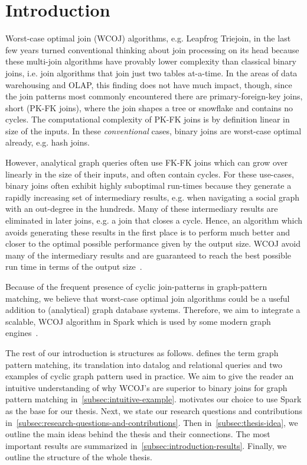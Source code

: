 \section{Introduction} \label{sec:introduction}
Worst-case optimal join (WCOJ) algorithms, e.g. Leapfrog Triejoin, in the last few years turned conventional thinking about join processing
on its head because these multi-join algorithms have provably lower complexity than classical binary joins,
i.e. join algorithms that join just two tables at-a-time.
In the areas of data warehousing and OLAP, this finding does not have much impact, though,
since the join patterns most commonly encountered there are primary-foreign-key joins, short (PK-FK joins),
where the join shapes a tree or snowflake and contains no cycles.
The computational complexity of PK-FK joins is by definition linear in size of the inputs.
In these \textit{conventional} cases, binary joins are worst-case optimal already, e.g. hash joins.

However, analytical graph queries often use FK-FK joins which can grow over linearly in the size of their inputs,
and often contain cycles.
For these use-cases, binary joins often exhibit highly suboptimal run-times because they generate a rapidly increasing set of
intermediary results, e.g. when navigating a social graph with an out-degree in the hundreds.
Many of these intermediary results are eliminated in later joins, e.g. a join that closes a cycle.
Hence, an algorithm which avoids generating these results in the first place is to perform much better and
closer to the optimal possible performance given by the output size.
\textsc{WCOJ} avoid many of the intermediary results and are guaranteed to reach the best possible run time in terms of
the output size~\cite{agm}.

Because of the frequent presence of cyclic join-patterns in graph-pattern matching, we believe that worst-case optimal join algorithms
could be a useful addition to (analytical) graph database systems.
Therefore, we aim to integrate a scalable, \textsc{WCOJ} algorithm in Spark which is used by some modern graph engines~\cite{caps,gcore,
graphframe}.

The rest of our introduction is structures as follows.
 defines the term graph pattern matching, its translation into datalog and
relational queries and two examples of cyclic graph pattern used in practice.
We aim to give the reader an intuitive understanding of why \textsc{WCOJ}'s are superior to binary joins for graph pattern matching
in~\cref{subsec:intuitive-example}.
 motivates our choice to use Spark as the base for our thesis.
Next, we state our research questions and contributions in~\cref{subsec:research-questions-and-contributions}.
Then in~\cref{subsec:thesis-idea}, we outline the main ideas behind the thesis and their connections.
The most important results are summarized in~\cref{subsec:introduction-results}.
Finally, we outline the structure of the whole thesis.

